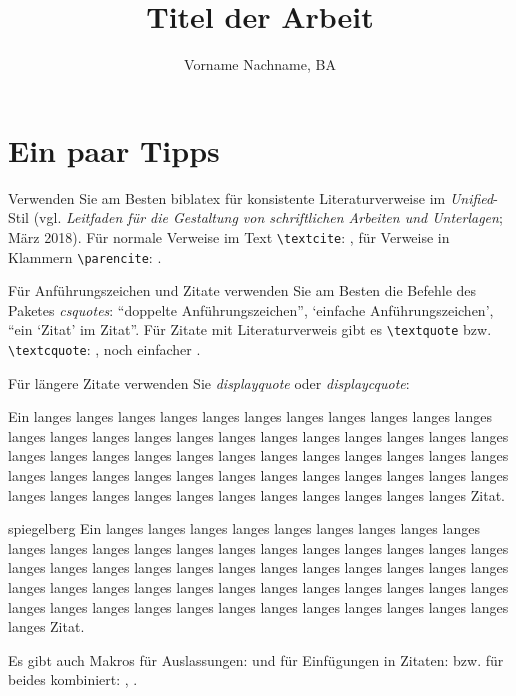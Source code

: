 \documentclass[naustrian]{univie-ling-paper}
\author{Vorname Nachname, BA}
\title{Titel der Arbeit}
\begin{document}
\maketitle

\makedeclaration

\tableofcontents

\section{Ein paar Tipps}\label{sec:hinweise}

Verwenden Sie am Besten \textsf{biblatex} für konsistente Literaturverweise im \emph{Unified}-Stil (vgl. \emph{Leitfaden für die Gestaltung von
schriftlichen Arbeiten und Unterlagen}; März 2018).
Für normale Verweise im Text \verb|\textcite|: \textcite[22]{brandt}, für Verweise in Klammern \verb|\parencite|: \parencite{brandt}.

Für Anführungszeichen und Zitate verwenden Sie am Besten die Befehle des Paketes \emph{csquotes}: \enquote{doppelte Anführungszeichen},
\enquote*{einfache Anführungszeichen}, \enquote{ein \enquote{Zitat} im Zitat}. Für Zitate mit Literaturverweis gibt es
\verb|\textquote| bzw. \verb|\textcquote|: , noch einfacher
.

Für längere Zitate verwenden Sie \emph{displayquote} oder \emph{displaycquote}:

\begin{displayquote}
	Ein langes langes langes langes langes langes langes langes langes langes langes langes langes langes langes langes langes langes
	langes langes langes langes langes langes langes langes langes langes langes langes langes langes langes langes langes langes langes langes
	langes langes langes langes langes langes langes langes langes langes langes langes langes langes langes langes langes langes langes langes
	Zitat.
\end{displayquote}

\begin{displaycquote}[202]{spiegelberg}
	Ein langes langes langes langes langes langes langes langes langes langes langes langes langes langes langes langes langes langes
	langes langes langes langes langes langes langes langes langes langes langes langes langes langes langes langes langes langes langes langes
	langes langes langes langes langes langes langes langes langes langes langes langes langes langes langes langes langes langes langes langes
	Zitat.
\end{displaycquote}
%
Es gibt auch Makros für Auslassungen: \textelp{} und für Einfügungen in Zitaten:  bzw. für beides kombiniert:
, .
\end{document}
